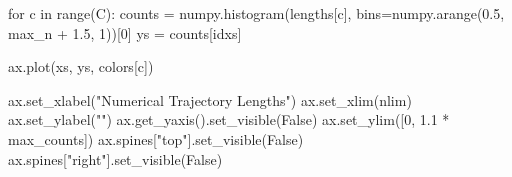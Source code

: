 \documentclass[
  letterpaper,
  DIV=11,
  numbers=noendperiod]{scrartcl}
\newenvironment{Shaded}{\begin{snugshade}}{\end{snugshade}}
\newcommand{\BuiltInTok}[1]{\textcolor[rgb]{0.00,0.23,0.31}{#1}}
\newcommand{\ControlFlowTok}[1]{\textcolor[rgb]{0.00,0.23,0.31}{#1}}
\newcommand{\DecValTok}[1]{\textcolor[rgb]{0.68,0.00,0.00}{#1}}
\newcommand{\FloatTok}[1]{\textcolor[rgb]{0.68,0.00,0.00}{#1}}
\newcommand{\KeywordTok}[1]{\textcolor[rgb]{0.00,0.23,0.31}{#1}}
\newcommand{\NormalTok}[1]{\textcolor[rgb]{0.00,0.23,0.31}{#1}}
\newcommand{\OperatorTok}[1]{\textcolor[rgb]{0.37,0.37,0.37}{#1}}
\newcommand{\StringTok}[1]{\textcolor[rgb]{0.13,0.47,0.30}{#1}}
\newcommand{\VariableTok}[1]{\textcolor[rgb]{0.07,0.07,0.07}{#1}}
\begin{document}
\begin{Shaded}
\begin{Highlighting}[]
  \ControlFlowTok{for}\NormalTok{ c }\KeywordTok{in} \BuiltInTok{range}\NormalTok{(C):}
\NormalTok{    counts }\OperatorTok{=}\NormalTok{ numpy.histogram(lengths[c], }
\NormalTok{                             bins}\OperatorTok{=}\NormalTok{numpy.arange(}\FloatTok{0.5}\NormalTok{, max\_n }\OperatorTok{+} \FloatTok{1.5}\NormalTok{, }\DecValTok{1}\NormalTok{))[}\DecValTok{0}\NormalTok{]}
\NormalTok{    ys }\OperatorTok{=}\NormalTok{ counts[idxs]}
    
\NormalTok{    ax.plot(xs, ys, colors[c])}
  
\NormalTok{  ax.set\_xlabel(}\StringTok{"Numerical Trajectory Lengths"}\NormalTok{)}
\NormalTok{  ax.set\_xlim(nlim)}
\NormalTok{  ax.set\_ylabel(}\StringTok{""}\NormalTok{)}
\NormalTok{  ax.get\_yaxis().set\_visible(}\VariableTok{False}\NormalTok{)}
\NormalTok{  ax.set\_ylim([}\DecValTok{0}\NormalTok{, }\FloatTok{1.1} \OperatorTok{*}\NormalTok{ max\_counts])}
\NormalTok{  ax.spines[}\StringTok{"top"}\NormalTok{].set\_visible(}\VariableTok{False}\NormalTok{)}
\NormalTok{  ax.spines[}\StringTok{"right"}\NormalTok{].set\_visible(}\VariableTok{False}\NormalTok{)}
\end{Highlighting}
\end{Shaded}
\end{document}
